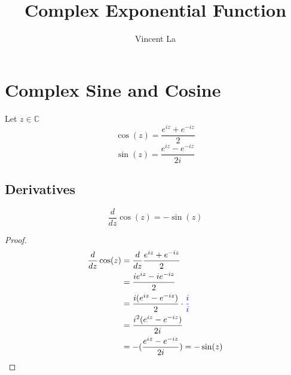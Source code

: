 \documentclass[]{article}
\title{Complex Exponential Function}
\author{Vincent La}
\begin{document}
\maketitle

\section{Complex Sine and Cosine}
Let $z \in \mathbb{C}$
\[\cos(z) = \frac{e^{iz} + e^{-iz}}{2}\]
\[\sin(z) = \frac{e^{iz} - e^{-iz}}{2i}\]
	
\subsection{Derivatives}
\[\frac{d}{dz} \cos(z) = -\sin(z) \]

\begin{proof}
	\[\begin{aligned}
		\frac{d}{dz} \cos(z)
		&= \frac{d}{dz} \frac{e^{iz} + e^{-iz}}{2} \\
		&= \frac{ie^{iz} - ie^{-iz}}{2} \\
		&= \frac{i(e^{iz} - e^{-iz})}{2} \cdot \color{blue}\frac{i}{i} \\
		&= \frac{i^2(e^{iz} - e^{-iz})}{2i} \\
		&= -(\frac{e^{iz} - e^{-iz}}{2i}) = -\sin(z)
	\end{aligned}\]
\end{proof}
\end{document}
